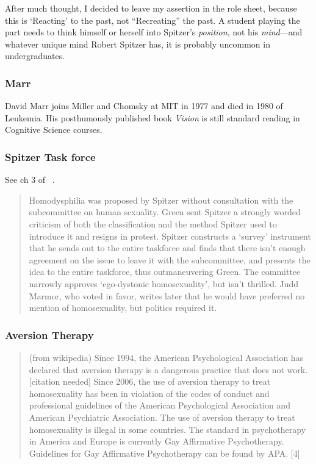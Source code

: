 \begin{refsection}
After much thought, I decided to leave my assertion in the role sheet, because this is `Reacting' to the past, not ``Recreating'' the past. A student playing the part needs to think himself or herself into Spitzer's \emph{position}, not his \emph{mind}---and whatever unique mind Robert Spitzer has, it is probably uncommon in undergraduates.

\subsubsection{Marr}
\label{marr}

David Marr joins Miller and Chomsky at MIT in 1977 and died in 1980 of Leukemia. His posthumously published book \emph{Vision} is still standard reading in Cognitive Science courses.

\subsubsection{Spitzer Task force}
\label{spitzertaskforce}

See ch 3 of ~\citep{Kutchins:9eEZL39p}. 

\begin{quote}

Homodysphilia was proposed by Spitzer without consultation with the subcommittee on human sexuality. Green sent Spitzer a strongly worded criticism of both the classification and the method Spitzer used to introduce it and resigns in protest. Spitzer constructs a `survey' instrument that he sends out to the entire taskforce and finds that there isn't enough agreement on the issue to leave it with the subcommittee, and presents the idea to the entire taskforce, thus outmaneuvering Green. The committee narrowly approves `ego-dystonic homosexuality', but isn't thrilled. Judd Marmor, who voted in favor, writes later that he would have preferred no mention of homosexuality, but politics required it.
\end{quote}

\subsubsection{Aversion Therapy}
\label{aversiontherapy}

\begin{quote}

(from wikipedia) Since 1994, the American Psychological Association has declared that aversion therapy is a dangerous practice that does not work.[citation needed] Since 2006, the use of aversion therapy to treat homosexuality has been in violation of the codes of conduct and professional guidelines of the American Psychological Association and American Psychiatric Association. The use of aversion therapy to treat homosexuality is illegal in some countries. The standard in psychotherapy in America and Europe is currently Gay Affirmative Psychotherapy. Guidelines for Gay Affirmative Psychotherapy can be found by APA. [4]
\end{quote}


\end{refsection}
